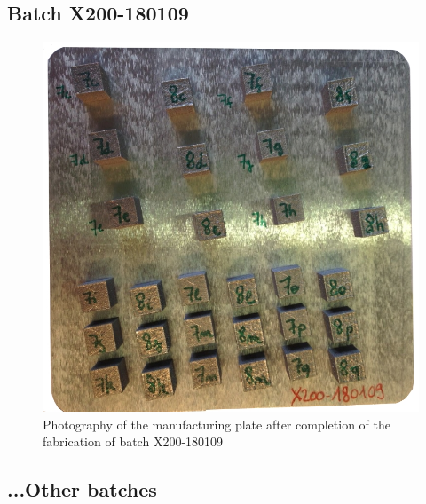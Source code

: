 \subsection{Batch X200-180109}

\begin{figure}[ht]
\centering
\includegraphics[scale=0.45]{Images/180109-real}
\decoRule
\caption[Photography of the manufacturing plate after completion of the fabrication of batch X200-180109]{Photography of the manufacturing plate after completion of the fabrication of batch X200-180109}
\label{fig:180109-real}
\end{figure}

\subsection{...Other batches}